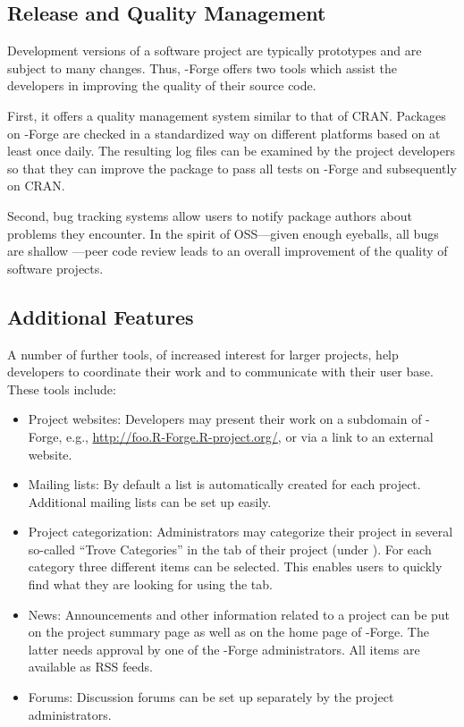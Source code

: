 \subsection{Release and Quality Management}
\label{sec:release_and_quality_management}

Development versions of a software project are typically
prototypes and are subject to many changes. Thus, \R{}-Forge offers
two tools which assist the developers in improving the quality of
their source code.

First, it offers a quality management system similar to 
that of CRAN. Packages on \R{}-Forge are checked in a
standardized way on different platforms based on
 at least once daily. The resulting log files can be
examined by the project developers so that they can improve
the package to pass all tests on \R{}-Forge and subsequently on CRAN.

Second, bug tracking systems allow users to notify
package authors about problems they encounter. In the spirit of
OSS---given enough eyeballs, all bugs are shallow
\citep{forge:Raymond:1999}---peer code review leads to an 
overall improvement of the quality of software projects.

\subsection{Additional Features}

A number of further tools, of increased interest for larger
projects, help developers to coordinate their work and to communicate
with their user base. These tools include:

\begin{itemize}
\item Project websites: Developers may present their work
  on a subdomain of \R{}-Forge, e.g.,
  \url{http://foo.R-Forge.R-project.org/}, or via a link to an
  external website.
\item Mailing lists: By default a list
   is automatically
  created for each project. Additional mailing lists can be
  set up easily.
\item Project categorization: Administrators may categorize their
  project in several so-called ``Trove Categories'' in the 
  tab of their project (under ). For each
  category three different items can be selected. This enables users
  to quickly find what they are looking for using the 
  tab.
\item News: Announcements and other information related to a project
  can be put on the project summary page as well as on the 
  home page of \R{}-Forge. The latter needs approval by one of the \R{}-Forge
  administrators. All items are available as RSS feeds.
\item Forums: Discussion forums can be set up separately by the
  project administrators.%
\end{itemize}

